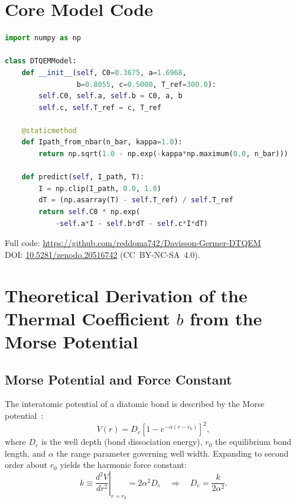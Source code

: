\documentclass[reprint,amsmath,amssymb,aps,pra,superscriptaddress]{revtex4-2}
\begin{document}
\appendix
\section{Core Model Code}
\label{app:code}
\begin{lstlisting}[language=Python]
import numpy as np

class DTQEMModel:
    def __init__(self, C0=0.3675, a=1.6968,
                 b=0.8055, c=0.5000, T_ref=300.0):
        self.C0, self.a, self.b = C0, a, b
        self.c, self.T_ref = c, T_ref

    @staticmethod
    def Ipath_from_nbar(n_bar, kappa=1.0):
        return np.sqrt(1.0 - np.exp(-kappa*np.maximum(0.0, n_bar)))

    def predict(self, I_path, T):
        I = np.clip(I_path, 0.0, 1.0)
        dT = (np.asarray(T) - self.T_ref) / self.T_ref
        return self.C0 * np.exp(
            -self.a*I - self.b*dT - self.c*I*dT)
\end{lstlisting}
Full code: \url{https://github.com/reddoma742/Davisson-Germer-DTQEM} \\
DOI: \href{https://doi.org/10.5281/zenodo.20516742}{10.5281/zenodo.20516742}
(CC~BY-NC-SA~4.0).

\section{Theoretical Derivation of the Thermal Coefficient $b$ from the Morse Potential}
\label{app:morse}

\subsection{Morse Potential and Force Constant}
The interatomic potential of a diatomic bond is described by the Morse
potential~\cite{morse1929}:
\begin{equation}
V(r)=D_e\!\left[1-e^{-\alpha(r-r_0)}\right]^2,
\label{eq:morse}
\end{equation}
where $D_e$ is the well depth (bond dissociation energy), $r_0$ the
equilibrium bond length, and $\alpha$ the range parameter governing well
width. Expanding to second order about $r_0$ yields the harmonic force
constant:
\begin{equation}
k \equiv \left.\frac{d^2V}{dr^2}\right|_{r=r_0} = 2\alpha^2 D_e
\quad\Longrightarrow\quad
D_e = \frac{k}{2\alpha^2}.
\label{eq:Dk}
\end{equation}
\end{document}
